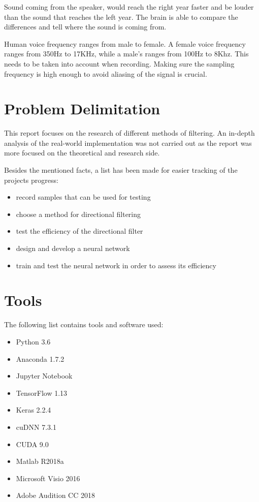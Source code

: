 Sound coming from the speaker, would reach  the right year faster and be louder than 
the sound that reaches the left year. The brain is able to compare the differences
and tell where the sound is coming from.

Human voice frequency ranges from male to female. A female voice frequency ranges from 
350Hz to 17KHz, while a male's ranges from 100Hz to 8Khz. This needs to be taken into
account when recording. Making sure the sampling frequency is high enough to avoid 
aliasing of the signal is crucial.\cite{VOICEFREQUENCY}
\newpage
\section{Problem Delimitation}
This report focuses on the research of different methods of
filtering. An in-depth analysis of the real-world implementation
was not carried out as the report was more focused on the
theoretical and research side.
   
Besides the mentioned facts, a list has been made for easier
tracking of the projects progress:

\begin{itemize}
\item record samples that can be used for testing\
\item choose a method for directional filtering
\item test the efficiency of the directional filter
\item design and develop a neural network
\item train and test the neural network in order to assess its efficiency
\end{itemize}

\section{Tools}
The following list contains tools and software used:
\begin{itemize}
\item Python 3.6
\item Anaconda 1.7.2
\item Jupyter Notebook
\item TensorFlow 1.13
\item Keras 2.2.4
\item cuDNN 7.3.1
\item CUDA 9.0
\item Matlab R2018a
\item Microsoft Visio 2016
\item Adobe Audition CC 2018
\end{itemize}